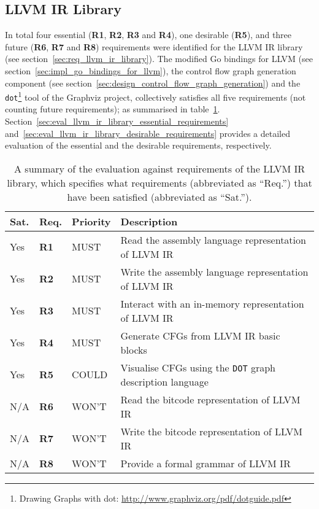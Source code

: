 
\subsection{LLVM IR Library}

In total four essential (\textbf{R1}, \textbf{R2}, \textbf{R3} and \textbf{R4}), one desirable (\textbf{R5}), and three future (\textbf{R6}, \textbf{R7} and \textbf{R8}) requirements were identified for the LLVM IR library (see section~\ref{sec:req_llvm_ir_library}). The modified Go bindings for LLVM (see section~\ref{sec:impl_go_bindings_for_llvm}), the control flow graph generation component (see section~\ref{sec:design_control_flow_graph_generation}) and the \texttt{dot}\footnote{Drawing Graphs with dot: \url{http://www.graphviz.org/pdf/dotguide.pdf}} tool of the Graphviz project, collectively satisfies all five requirements (not counting future requirements); as summarised in table~\ref{tbl:eval_summary_of_llvm_ir_library}. Section~\ref{sec:eval_llvm_ir_library_essential_requirements} and~\ref{sec:eval_llvm_ir_library_desirable_requirements} provides a detailed evaluation of the essential and the desirable requirements, respectively.

\begin{table}[htbp]
	\begin{center}
		\begin{tabular}{|l|l|l|l|}
			\hline
			Sat. & Req. & Priority & Description \\
			\hline
			\rowcolor{light_green_3}
			Yes & \textbf{R1} & MUST & Read the assembly language representation of LLVM IR \\
			\rowcolor{light_green_3}
			Yes & \textbf{R2} & MUST & Write the assembly language representation of LLVM IR \\
			\rowcolor{light_green_3}
			Yes & \textbf{R3} & MUST & Interact with an in-memory representation of LLVM IR \\
			\rowcolor{light_green_3}
			Yes & \textbf{R4} & MUST & Generate CFGs from LLVM IR basic blocks \\
			\hline
			\rowcolor{light_green_3}
			Yes & \textbf{R5} & COULD & Visualise CFGs using the \texttt{DOT} graph description language \\
			\hline
			N/A & \textbf{R6} & WON'T & Read the bitcode representation of LLVM IR \\
			N/A & \textbf{R7} & WON'T & Write the bitcode representation of LLVM IR \\
			N/A & \textbf{R8} & WON'T & Provide a formal grammar of LLVM IR \\
			\hline
		\end{tabular}
	\end{center}
	\caption{A summary of the evaluation against requirements of the LLVM IR library, which specifies what requirements (abbreviated as ``Req.'') that have been satisfied (abbreviated as ``Sat.'').}
	\label{tbl:eval_summary_of_llvm_ir_library}
\end{table}




